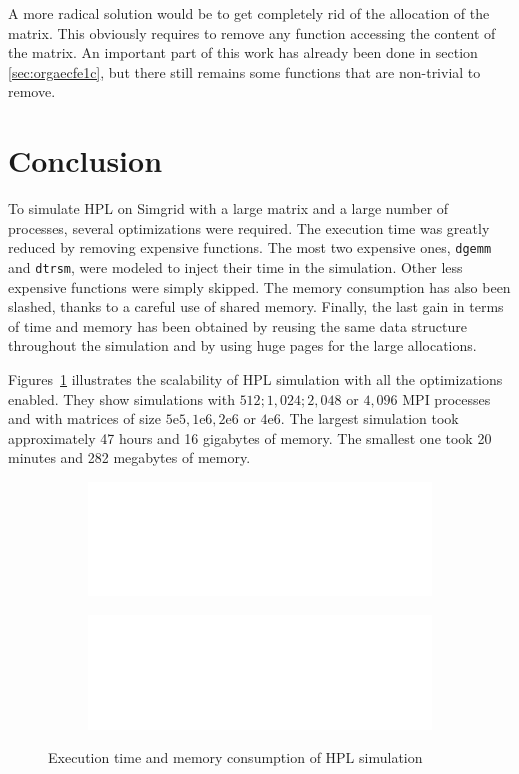 \documentclass[12pt, a4paper]{memoir}
\begin{document}
A more radical solution would be to get completely rid of the allocation of the matrix. This obviously requires to
remove any function accessing the content of the matrix. An important part of this work has already been done in
section \ref{sec:orgaecfe1c}, but there still remains some functions that are non-trivial to remove.
\section{Conclusion}
\label{sec:orgeba755b}
To simulate HPL on Simgrid with a large matrix and a large number of processes, several optimizations were
required. The execution time was greatly reduced by removing expensive functions. The most two expensive ones, \texttt{dgemm}
and \texttt{dtrsm}, were modeled to inject their time in the simulation. Other less expensive functions were simply
skipped. The memory consumption has also been slashed, thanks to a careful use of shared memory. Finally, the last
gain in terms of time and memory has been obtained by reusing the same data structure throughout the simulation and
by using huge pages for the large allocations.

Figures~\ref{fig:scalability} illustrates the scalability of HPL simulation with all the optimizations enabled. They
show simulations with \(512 ; 1,024 ; 2,048\) or \(4,096\) MPI processes and with matrices of size \(5\mathrm{e}5,
   1\mathrm{e}6, 2\mathrm{e}6\) or \(4\mathrm{e}6\). The largest simulation took approximately 47 hours and 16 gigabytes of
memory. The smallest one took 20 minutes and 282 megabytes of memory.
\begin{figure}[htpb]
\centering
\begin{subfigure}{\textwidth}
  \includegraphics[width=\linewidth,page=2]{../scalability/plot_size.pdf}
\end{subfigure}
\begin{subfigure}{\textwidth}
  \includegraphics[width=\linewidth,page=2]{../scalability/plot_nbproc.pdf}
\end{subfigure}
\caption{Execution time and memory consumption of HPL simulation}
\label{fig:scalability}
\end{figure}
\end{document}
